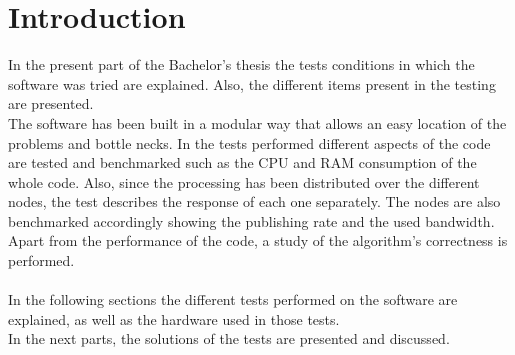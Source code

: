 \chapter{Introduction}

In the present part of the Bachelor's thesis the tests conditions in which the software was tried are explained. Also, the different items present in the testing are presented. \\

The software has been built in a modular way that allows an easy location of the problems and bottle necks.
In the tests performed different aspects of the code are tested and benchmarked such as the CPU and RAM consumption of the whole code. Also, since the processing has been distributed over the different nodes, the test describes the response of each one separately. 
The nodes are also benchmarked accordingly showing the publishing rate and the used bandwidth. 
Apart from the performance of the code, a study of the algorithm's correctness is performed. 
\\


\\

In the following sections the different tests performed on the software are explained, as well as the hardware used in those tests. 
\\

In the next parts, the solutions of the tests are presented and discussed. 